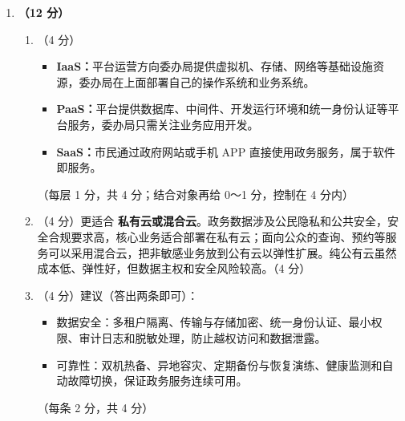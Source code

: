 \documentclass[a4paper,11pt]{article}
\begin{document}
\begin{enumerate}[start=29, label=\textbf{\arabic*.}, leftmargin=2.4em, itemsep=0.55em]
\item \textbf{（12 分）}
\begin{enumerate}[label=（\arabic*）, leftmargin=2.2em, itemsep=2pt]
  \item （4 分）
  \begin{itemize}[leftmargin=1.8em, itemsep=1pt]
    \item \textbf{IaaS：}平台运营方向委办局提供虚拟机、存储、网络等基础设施资源，委办局在上面部署自己的操作系统和业务系统。
    \item \textbf{PaaS：}平台提供数据库、中间件、开发运行环境和统一身份认证等平台服务，委办局只需关注业务应用开发。
    \item \textbf{SaaS：}市民通过政府网站或手机 APP 直接使用政务服务，属于软件即服务。
  \end{itemize}
  \hfill（每层 1 分，共 4 分；结合对象再给 0～1 分，控制在 4 分内）

  \item （4 分）更适合 \textbf{私有云或混合云}。政务数据涉及公民隐私和公共安全，安全合规要求高，核心业务适合部署在私有云；面向公众的查询、预约等服务可以采用混合云，把非敏感业务放到公有云以弹性扩展。纯公有云虽然成本低、弹性好，但数据主权和安全风险较高。\hfill（4 分）

  \item （4 分）建议（答出两条即可）：
  \begin{itemize}[leftmargin=1.8em, itemsep=1pt]
    \item 数据安全：多租户隔离、传输与存储加密、统一身份认证、最小权限、审计日志和脱敏处理，防止越权访问和数据泄露。
    \item 可靠性：双机热备、异地容灾、定期备份与恢复演练、健康监测和自动故障切换，保证政务服务连续可用。
  \end{itemize}
  \hfill（每条 2 分，共 4 分）
\end{enumerate}

\end{enumerate}
\end{document}
